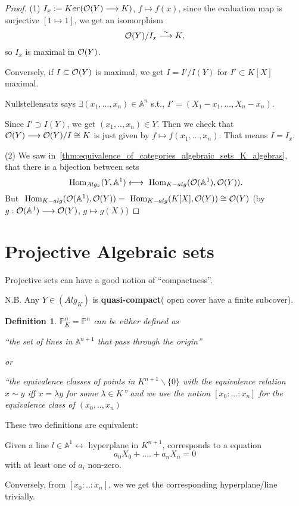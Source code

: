\documentclass[11pt]{article}
\newtheorem{dfn}[thm]{Definition}
\renewcommand{\hom}{\text{ Hom}}
\newcommand{\affn}{\mathbb A}
\newcommand{\proj}{\mathbb P}
\newcommand{\calo}{{\cal O}}
\newcommand{\lrta}{\longrightarrow}
\newcommand{\llrta}{\longleftrightarrow}
\begin{document}
	\begin{proof}
		(1) $I_x:=Ker(\calo(Y)\lrta K)$, $f\mapsto f(x)$, since the evaluation map is surjective $[1\mapsto 1]$, we get an isomorphism 
		$$
		\calo(Y)/I_x\overset{\sim}{\lrta} K,
		$$
		so $I_x$ is maximal in $\calo(Y)$.
		
		Conversely, if $I\subset \calo(Y)$ is maximal, we get $I=I'/I(Y)$ for $I'\subset K[X]$ maximal. 
		
		Nullstellensatz says $\exists (x_1,...,x_n)\in\affn^n$ s.t., $I'=(X_1-x_1,...,X_n-x_n)$. 
		
		Since $I'\supset I(Y)$, we get $(x_1,..,x_n)\in Y$. Then we check that $\calo(Y)\lrta\calo(Y)/I\cong K$ is just given by $f\mapsto f(x_1,...,x_n)$. That means $I=I_x$.
		
		(2) We saw in~\ref{thm:equivalence_of_categories_algebraic_sets_K_algebras}, that there is a bijection between sets
		$$
		\hom_{Alg_k}(Y,\affn^1)\llrta \hom_{K-alg}(\calo(\affn^1),\calo(Y)).
		$$
		But $\hom_{K-alg}(\calo(\affn^1),\calo(Y))=\hom_{K-alg}(K[X],\calo(Y))\cong \calo(Y)$ (by $g:\calo(\affn^1)\lrta \calo(Y)$, $g\mapsto g(X)$)
	\end{proof}
	\section*{Projective Algebraic sets}
	
	Projective sets can have a good notion of ``compactness''.
	
	N.B. Any $Y\in (Alg_K)$ is \textbf{quasi-compact}( open cover have a finite subcover).
	
	\begin{dfn}
		$\proj^n_K=\proj^n$ can be either defined as 
		
		``the set of  lines in $\affn^{n+1}$ that pass through the origin''
		
		or
		
		``the equivalence classes of points in $K^{n+1}\backslash \{0\}$ with the equivalence relation $x\sim y$ iff $x=\lambda y$ for some $\lambda \in K$'' and we use the notion $[x_0:...:x_n]$ for the equivalence class of $(x_0,..,x_n)$
	\end{dfn}
	
	These two definitions are equivalent: 
	
	Given a line $l\in \affn^1\llrta $ hyperplane in $K^{n+1}$, corresponds to a equation
	$$
	a_0X_0+....+a_n X_n=0
	$$
	with at least one of $a_i$ non-zero.
	
	Conversely, from $[x_0:..:x_n]$, we  we get the corresponding hyperplane/line trivially.
	
\end{document}
